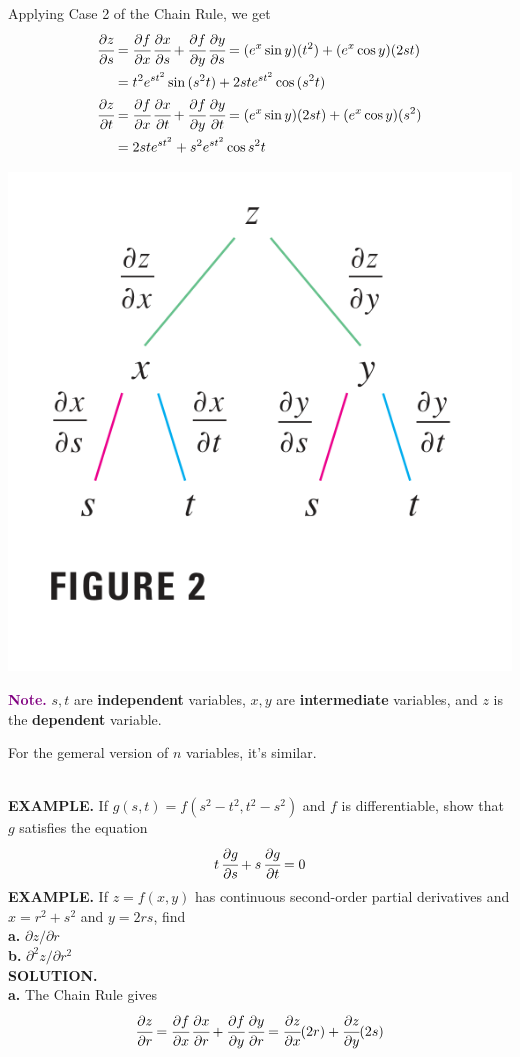 \documentclass{article}
\begin{document}
Applying Case 2 of the Chain Rule, we get 
\begin{align*}
  \cfrac{\partial z }{\partial s } & = \cfrac{\partial f }{ \partial x } \, \cfrac{\partial x }{\partial s } + \cfrac{\partial f }{\partial y }\, \cfrac{\partial y }{ \partial s } = (e^x \sin{y})(t^2) + (e^x \cos{y})(2st) \\
                                   & = t^2 e^{st^2} \sin{(s^2t)} + 2ste^{st^2}\cos{(s^2t)} \\
  \cfrac{\partial z }{\partial t } & = \cfrac{\partial f }{ \partial x } \, \cfrac{\partial x }{\partial t } + \cfrac{\partial f }{\partial y }\, \cfrac{\partial y }{ \partial t } = (e^x \sin{y})(2st) + (e^x \cos{y})(s^2) \\
                                   & = 2ste^{st^2} + s^2 e^{st^2}\cos{s^2t}
\end{align*}

\begin{minipage}[]{0.28\linewidth}
 \includegraphics[width = 4 cm]{./images/dxyzt.png}
  
\end{minipage}
\begin{minipage}[]{0.69\linewidth}
\textcolor{purple}{ \textbf{{\selectfont Note.}}}
 $s, t $ are \textbf{independent} variables, $x, y $ are \textbf{intermediate} variables, and $z $ is the \textbf{dependent} variable.

 For the gemeral version of $n$ variables, it's similar.

  
\end{minipage}\\
{\selectfont \textbf{\textcolor{blue5}{ EXAMPLE.}}} If $g(s,t) = f(s^2 - t^2, t^2 - s^2 )$ and $f $ is differentiable, show that $g $ satisfies the equation  \[t \,\cfrac{\partial g }{ \partial s } + s \, \cfrac{\partial g }{ \partial t } = 0\]
{\selectfont \textbf{\textcolor{blue5}{ EXAMPLE.}}} If $z = f(x,y)$ has continuous second-order partial derivatives and $x = r^2 + s^2 $ and $ y = 2 rs $, find \\
\textbf{a.} $\partial z / \partial r$ \\
\textbf{b.} $\partial ^2 z / \partial r^2 $ \\
{\selectfont \textbf{\textcolor{blue5}{SOLUTION.}}} \\
\textbf{a.} The Chain Rule gives 
\[ \cfrac{\partial z }{\partial r }  = \cfrac{\partial f }{ \partial x } \, \cfrac{\partial x }{\partial r } + \cfrac{\partial f }{\partial y }\, \cfrac{\partial y }{ \partial r } = \cfrac{\partial z }{ \partial x } (2r) + \cfrac{\partial  z }{ \partial y } (2s )\]
\end{document}
